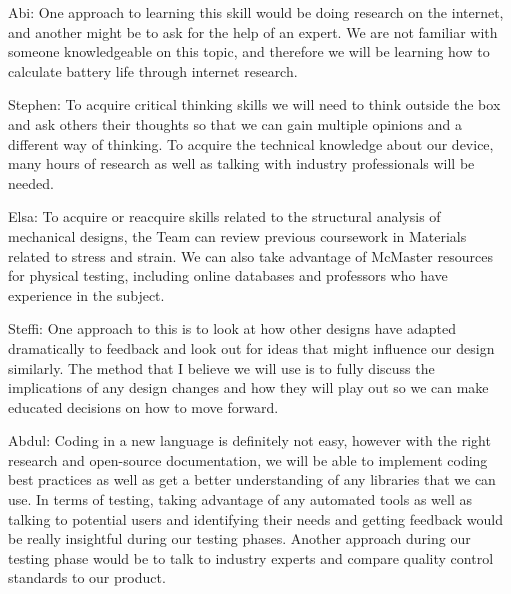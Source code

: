 \documentclass[12pt, titlepage]{article}
\begin{document}
\begin{enumerate}
Abi: One approach to learning this skill would be doing research on the internet, and another might be to ask for the help of an expert. We are not familiar with someone knowledgeable on this topic, and therefore we will be learning how to calculate battery life through internet research. 

Stephen: To acquire critical thinking skills we will need to think outside the box and ask others their thoughts so that we can gain multiple opinions and a different way of thinking. To acquire the technical knowledge about our device, many hours of research as well as talking with industry professionals will be needed.

Elsa: To acquire or reacquire skills related to the structural analysis of mechanical designs, the Team can review previous coursework in Materials related to stress and strain. We can also take advantage of McMaster resources for physical testing, including online databases and professors who have experience in the subject. 

Steffi: One approach to this is to look at how other designs have adapted dramatically to feedback and look out for ideas that might influence our design similarly.  The method that I believe we will use is to fully discuss the implications of any design changes and how they will play out so we can make educated decisions on how to move forward.

Abdul: Coding in a new language is definitely not easy, however with the right research and open-source documentation, we will be able to implement coding best practices as well as get a better understanding of any libraries that we can use. In terms of testing, taking advantage of any automated tools as well as talking to potential users and identifying their needs and getting feedback would be really insightful during our testing phases. Another approach during our testing phase would be to talk to industry experts and compare quality control standards to our product. 

\end{enumerate}
\end{document}
